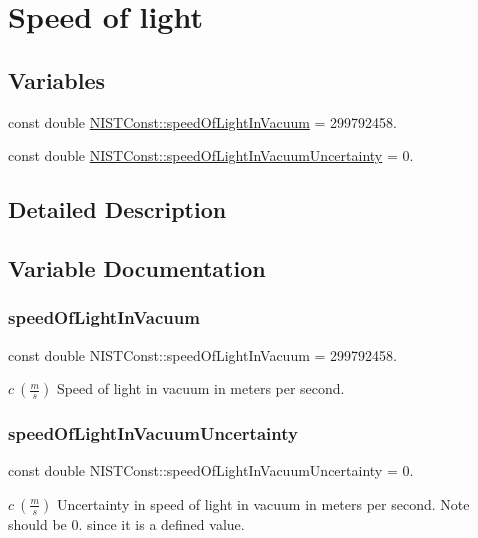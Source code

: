 \hypertarget{group___speed_of_light}{}\section{Speed of light}
\label{group___speed_of_light}
\subsection*{Variables}
\begin{DoxyCompactItemize}
\item 
const double \hyperlink{group___speed_of_light_gacb4a04d9cca33259effabdd28c28e964}{N\+I\+S\+T\+Const\+::speed\+Of\+Light\+In\+Vacuum} = 299792458.
\item 
const double \hyperlink{group___speed_of_light_gafb67b7afe777d6e23a70ae69e83542d1}{N\+I\+S\+T\+Const\+::speed\+Of\+Light\+In\+Vacuum\+Uncertainty} = 0.
\end{DoxyCompactItemize}


\subsection{Detailed Description}


\subsection{Variable Documentation}
\mbox{\label{group___speed_of_light_gacb4a04d9cca33259effabdd28c28e964}} 
\subsubsection{\texorpdfstring{speed\+Of\+Light\+In\+Vacuum}{speedOfLightInVacuum}}
{\footnotesize\ttfamily const double N\+I\+S\+T\+Const\+::speed\+Of\+Light\+In\+Vacuum = 299792458.}

$c \ (\frac{m}{s})$ Speed of light in vacuum in meters per second. \mbox{\label{group___speed_of_light_gafb67b7afe777d6e23a70ae69e83542d1}} 
\subsubsection{\texorpdfstring{speed\+Of\+Light\+In\+Vacuum\+Uncertainty}{speedOfLightInVacuumUncertainty}}
{\footnotesize\ttfamily const double N\+I\+S\+T\+Const\+::speed\+Of\+Light\+In\+Vacuum\+Uncertainty = 0.}

$c \ (\frac{m}{s})$ Uncertainty in speed of light in vacuum in meters per second. Note should be 0. since it is a defined value. 